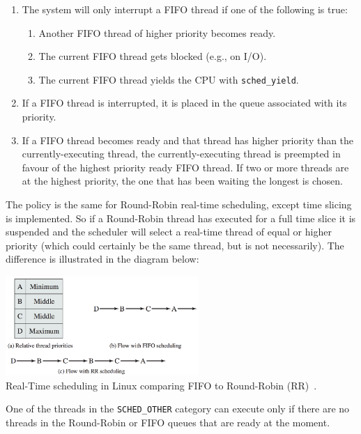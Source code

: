 \begin{enumerate}
	\item The system will only interrupt a FIFO thread if one of the following is true:
	\begin{enumerate}
		\item Another FIFO thread of higher priority becomes ready.
		\item The current FIFO thread gets blocked (e.g., on I/O).
		\item The current FIFO thread yields the CPU with \texttt{sched\_yield}.
	\end{enumerate}
	\item If a FIFO thread is interrupted, it is placed in the queue associated with its priority.
	\item If a FIFO thread becomes ready and that thread has higher priority than the currently-executing thread, the currently-executing thread is preempted in favour of the highest priority ready FIFO thread. If two or more threads are at the highest priority, the one that has been waiting the longest is chosen.
\end{enumerate}

The policy is the same for Round-Robin real-time scheduling, except time slicing is implemented. So if a Round-Robin thread has executed for a full time slice it is suspended and the scheduler will select a real-time thread of equal or higher priority (which could certainly be the same thread, but is not necessarily). The difference is illustrated in the diagram below:

\begin{center}
	\includegraphics[width=0.55\textwidth]{images/linux-rts.png}\\
	Real-Time scheduling in Linux comparing FIFO to Round-Robin (RR)~\cite{osi}.
\end{center}

One of the threads in the \texttt{SCHED\_OTHER} category can execute only if there are no threads in the Round-Robin or FIFO queues that are ready at the moment.

